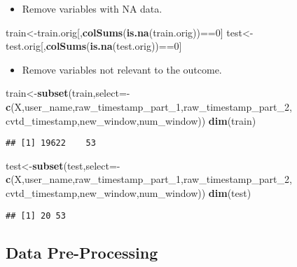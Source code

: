 \documentclass[]{article}
\newenvironment{Shaded}{\begin{snugshade}}{\end{snugshade}}
\newcommand{\KeywordTok}[1]{\textcolor[rgb]{0.13,0.29,0.53}{\textbf{{#1}}}}
\newcommand{\DataTypeTok}[1]{\textcolor[rgb]{0.13,0.29,0.53}{{#1}}}
\newcommand{\DecValTok}[1]{\textcolor[rgb]{0.00,0.00,0.81}{{#1}}}
\newcommand{\NormalTok}[1]{{#1}}
\begin{document}
\begin{itemize}
\itemsep1pt\parskip0pt
\item
  Remove variables with NA data.
\end{itemize}

\begin{Shaded}
\begin{Highlighting}[]
\NormalTok{train<-train.orig[,}\KeywordTok{colSums}\NormalTok{(}\KeywordTok{is.na}\NormalTok{(train.orig))==}\DecValTok{0}\NormalTok{]}
\NormalTok{test<-test.orig[,}\KeywordTok{colSums}\NormalTok{(}\KeywordTok{is.na}\NormalTok{(test.orig))==}\DecValTok{0}\NormalTok{]}
\end{Highlighting}
\end{Shaded}

\begin{itemize}
\itemsep1pt\parskip0pt
\item
  Remove variables not relevant to the outcome.
\end{itemize}

\begin{Shaded}
\begin{Highlighting}[]
\NormalTok{train<-}\KeywordTok{subset}\NormalTok{(train,}\DataTypeTok{select=}\NormalTok{-}\KeywordTok{c}\NormalTok{(X,user_name,raw_timestamp_part_1,raw_timestamp_part_2,}
                  \NormalTok{cvtd_timestamp,new_window,num_window))}
\KeywordTok{dim}\NormalTok{(train)}
\end{Highlighting}
\end{Shaded}

\begin{verbatim}
## [1] 19622    53
\end{verbatim}

\begin{Shaded}
\begin{Highlighting}[]
\NormalTok{test<-}\KeywordTok{subset}\NormalTok{(test,}\DataTypeTok{select=}\NormalTok{-}\KeywordTok{c}\NormalTok{(X,user_name,raw_timestamp_part_1,raw_timestamp_part_2,}
                  \NormalTok{cvtd_timestamp,new_window,num_window))}
\KeywordTok{dim}\NormalTok{(test)}
\end{Highlighting}
\end{Shaded}

\begin{verbatim}
## [1] 20 53
\end{verbatim}

\subsection{Data Pre-Processing}\label{data-pre-processing}
\end{document}
